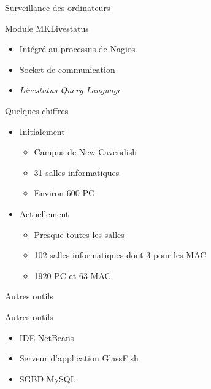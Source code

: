 \begin{frame}{Surveillance des ordinateurs}
	\begin{block}{Module MKLivestatus}
		\begin{itemize}
			\item Int\'egr\'e au processus de Nagios
			\item Socket de communication
			\item \textit{Livestatus Query Language}
		
		\end{itemize}

	\end{block}
	
	\begin{block}{Quelques chiffres}
		\begin{itemize}
			\item Initialement
			\begin{itemize}
				\item Campus de New Cavendish
				\item 31 salles informatiques
				\item Environ 600 PC
			
			\end{itemize}
			
			\item Actuellement
			\begin{itemize}
				\item Presque toutes les salles
				\item 102 salles informatiques dont 3 pour les MAC
				\item 1920 PC et 63 MAC
			
			\end{itemize}
		
		\end{itemize}

	\end{block}
	
\end{frame}


\begin{frame}{Autres outils}
	\begin{figure}[h]
		\centering
		\qquad
		\qquad

	\end{figure}

	\begin{block}{Autres outils}
		\begin{itemize}
			\item IDE NetBeans
			\item Serveur d'application GlassFish
			\item SGBD MySQL
		
		\end{itemize}

	\end{block}
	
\end{frame}

